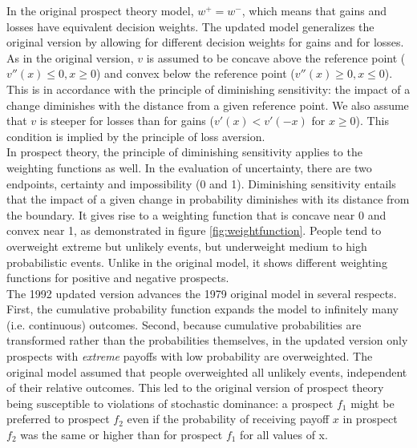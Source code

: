 \documentclass[a4paper,12pt]{article}
\numberwithin{equation}{section}
\theoremstyle{definition}
\begin{document}
In the original prospect theory model, $w^+ = w^-$, which means that gains and losses have equivalent decision weights. The updated model generalizes the original version by allowing for different decision weights for gains and for losses. 
\\

As in the original version, $v$ is assumed to be concave above the reference point ($v''(x) \leq 0, x \geq 0$) and convex below the reference point ($v''(x) \geq 0, x \leq 0$). This is in accordance with the principle of diminishing sensitivity: the impact of a change diminishes with the distance from a given reference point. We also assume that $v$ is steeper for losses than for gains ($v'(x) < v'(-x)$ for $x \geq 0$). This condition is implied by the principle of loss aversion.
\\

In prospect theory, the principle of diminishing sensitivity applies to the weighting functions as well. In the evaluation of uncertainty, there are two endpoints, certainty and impossibility (0 and 1). Diminishing sensitivity entails that the impact of a given change in probability diminishes with its distance from the boundary. It gives rise to a weighting function that is concave near 0 and convex near 1, as demonstrated in figure \ref{fig:weightfunction}. People tend to overweight extreme but unlikely events, but underweight medium to high probabilistic events. Unlike in the original model, it shows different weighting functions for positive and negative prospects.
\\

\indent The 1992 updated version advances the 1979 original model in several respects. First, the cumulative probability function expands the model to infinitely many (i.e. continuous) outcomes. Second, because cumulative probabilities are transformed rather than the probabilities themselves, in the updated version  only prospects with \textit{extreme} payoffs with low probability are overweighted. The original model assumed that people overweighted all unlikely events, independent of their relative outcomes. This led to the original version of prospect theory being susceptible to violations of stochastic dominance: a prospect $f_1$ might be preferred to prospect $f_2$ even if the probability of receiving payoff $x$ in prospect $f_2$ was the same or higher than for prospect $f_1$ for all values of x.
\end{document}
